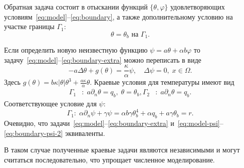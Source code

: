 Обратная задача состоит в отыскании функций $\{\theta, \varphi\}$
удовлетворяющих условиям~\eqref{eq:model}--\eqref{eq:boundary}, а также дополнительному условию
на участке границы $\Gamma_1$:
\begin{equation}
    \label{eq:boundary-extra}
    \theta = \theta_b \text{ на } \Gamma_1.
\end{equation}


Если определить новую неизвестную функцию $\psi = a\theta + \alpha b \varphi$ то
задачу~\eqref{eq:model}--\eqref{eq:boundary-extra} можно переписать в виде
\begin{equation}
    \label{eq:model-psi}
    - a \Delta \theta + g (\theta) = \frac{\kappa}{\alpha}\psi, \quad
    \Delta \psi = 0, \; x \in \Omega.
\end{equation}
Здесь $g(\theta) = b \kappa|\theta|\theta^3 + \frac{a\kappa}{\alpha}\theta$.
Краевые условия для температуры имеют вид
\begin{equation}
    \label{eq:boundary-psi-1}
    \begin{aligned}
        \Gamma_1&: \; a \partial_n \theta = q_b, \; \theta = \theta_b,
        \Gamma_2&: \;  a \partial_n \theta = q_b.
    \end{aligned}
\end{equation}
Соответствующее условие для $\psi$:
\begin{equation}
    \label{eq:boundary-psi-2}
        \Gamma_1: \; \alpha \partial_n \psi + \gamma \psi
        = \alpha b \gamma \theta_b^4
        + \alpha q_b + a \gamma \theta_b = r.
\end{equation}
Очевидно, что задачи~\eqref{eq:model}--\eqref{eq:boundary-extra} и~\eqref{eq:model-psi}--\eqref{eq:boundary-psi-2}
эквиваленты.

В таком случае полученные краевые задачи являются независимыми и могут считаться последовательно,
что упрощает численное моделирование.

